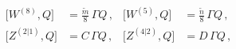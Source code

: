 \begin{equation}
\label{e:WQcomm}
\begin{aligned}
\big[ W^{(8)}, Q \big] &= \tfrac{\tilde m}{8}\, \Gamma Q\, ,&
  \big[ W^{(5)}, Q\big] &= \tfrac{\tilde n}{8}\, \Gamma Q\, ,\\[1ex]
\big[ Z^{(2|1)}, Q\big] &= C\, \Gamma Q\, , &
  \big[ Z^{(4|2)}, Q\big] &= D\, \Gamma Q\, ,
\end{aligned}
\end{equation}

